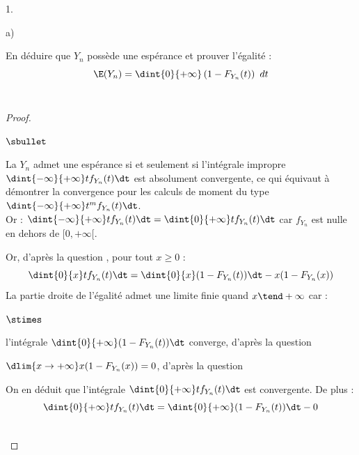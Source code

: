 \begin{noliste}{1.}
\begin{noliste}{a)}
  \item En déduire que $Y_{n}$ possède une espérance et prouver
    l'égalité :
    \[
    \E(Y_{n}) = \dint{0}{+ \infty} \left(1-F_{Y_{n}}(t)\right) \ dt
    \]~\\[-1.2cm]
    
    \begin{proof}~
      \begin{noliste}{$\sbullet$}
      \item La \var $Y_n$ admet une espérance si et seulement si
        l'intégrale impropre $\dint{-\infty}{+\infty} tf_{Y_n}(t)\dt$
        est absolument convergente, ce qui équivaut à démontrer la
        convergence pour les calculs de moment du type
        $\dint{-\infty}{+\infty} t^m f_{Y_n}(t)\dt$.\\
        Or : $\dint{-\infty}{+\infty} tf_{Y_n}(t)\dt =
        \dint{0}{+\infty} tf_{Y_n}(t)\dt$ car $f_{Y_n}$ est nulle en
        dehors de $[0, +\infty[$.
      \item Or, d'après la question , pour tout $x\geq 0$ :
      \[
      \dint{0}{x} tf_{Y_n}(t)\dt = \dint{0}{x}(1-F_{Y_n}(t)) \dt -
      x(1-F_{Y_n}(x)) %
      \]
      La partie droite de l'égalité admet une limite finie quand $x
      \tend +\infty$ car :
      \begin{noliste}{$\stimes$}
      \item l'intégrale $\dint{0}{+\infty} (1-F_{Y_n}(t))\dt$ 
	converge, d'après la question 
      \item $\dlim{x\to+\infty} x(1-F_{Y_n}(x))=0$, d'après la 
	question 
      \end{noliste}
      On en déduit que l'intégrale $\dint{0}{+\infty} tf_{Y_n}(t)\dt$ est
      convergente. De plus :
      \[
      \dint{0}{+\infty} tf_{Y_n}(t)\dt =
      \dint{0}{+\infty}(1-F_{Y_n}(t)) \dt - 0
      \]
      \end{noliste}
      ~\\[-1cm]
    \end{proof}
  \end{noliste}



\end{noliste}
